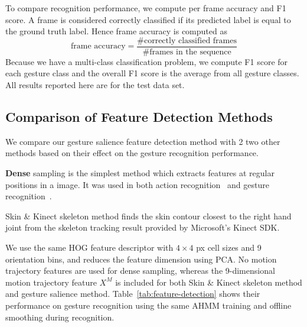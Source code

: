 \documentclass{sigchi}
\newcommand\tabhead[1]{\small\textbf{#1}}
\begin{document}
To compare recognition performance, we compute per frame accuracy and F1 score. 
A frame is considered correctly classified if its predicted label is equal to the ground truth label.
Hence frame accuracy is computed as
\begin{displaymath}
\text{frame accuracy} = \frac{\text{\# correctly classified frames}}{\text{\# frames in the sequence}}
\end{displaymath}
Because we have a multi-class classification problem, we compute F1 score for each gesture class and 
the overall F1 score is the average from all gesture classes. All results
reported here are for the test data set.

\subsection{Comparison of Feature Detection Methods}
We compare our gesture salience feature detection method with 2 two other
methods based on their effect on the gesture recognition performance. 

\textbf{Dense} sampling is the simplest method which extracts features at
regular positions in a image. It was used in both action recognition~\cite{wang-spatio-2009}
and gesture recognition~\cite{konecny2012}.

Skin \& Kinect skeleton method finds the skin contour closest to the right hand
joint from the skeleton tracking result provided by Microsoft's Kinect SDK.

We use the same HOG feature descriptor with $4\times 4$ px cell sizes and 9
orientation bins, and reduces the feature dimension using PCA.
No motion trajectory features are used for dense sampling, whereas the
9-dimensional motion trajectory feature $X^M$ is included for both Skin \&
Kinect skeleton method and gesture salience method.
Table~\ref{tab:feature-detection} shows their performance on gesture recognition using the same AHMM training and offline smoothing during recognition.
\end{document}
